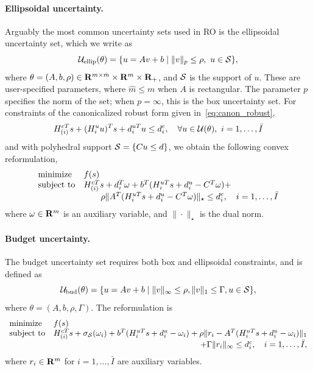 \paragraph{Ellipsoidal uncertainty.}
Arguably the most common uncertainty sets used in \gls{RO} is the ellipsoidal uncertainty set, which we write as
$$ {\mathcal{U}}_{\text{ellip}}(\theta) = \{u=Av+b \mid \| v \|_p \leq \rho,~u \in \mathcal{S} \},$$
where $\theta = (A,b,\rho) \in {\mathbf R}^{m\times\hat{m}} \times {\mathbf R}^m \times {\mathbf R}_+$, and $\mathcal{S}$ is the support of $u$. These are user-specified parameters, where $\hat{m} \leq m$ when $A$ is rectangular. The parameter $p$ specifies the norm of the set; when $p = \infty$, this is the box uncertainty set.
For constraints of the canonicalized robust form given in~\eqref{eq:canon_robust}, \ie 
\begin{equation}
\label{eq:simpleaffine}
H^{cT}_{(i)}s + (H^u_iu)^Ts + d_i^{uT}u \le d_i^c, \quad \forall u \in {\mathcal{U}}(\theta),~ i = 1,\dots,\bar{I}
\end{equation}
 and with polyhedral support $\mathcal{S} = \{Cu\leq d\}$, we obtain the following convex reformulation,
\begin{equation*}
	\begin{array}{ll}
		\mbox{minimize} & f(s)\\
		\mbox{subject to} & H^{cT}_{(i)}s +  d_i^T\omega + b^T( H_i^{uT}s + d_i^u -C^T\omega) +  \\
        &\qquad \rho\|A^T(H_i^{uT}s + d_i^u-C^T\omega)\|_\star \le d_i^c, \quad i = 1,\dots,\bar{I}	\end{array}
\end{equation*}
where $\omega \in {\mathbf R}^m$ is an auxiliary variable, and $\|\cdot\|_\star$ is the dual norm. 

\paragraph{Budget uncertainty.}
The budget uncertainty set requires both box and ellipsoidal constraints, and is defined as
$$ {\mathcal{U}}_{\text{bud}}(\theta) = \{u = Av+b \mid \| v\|_\infty \leq \rho, \| v \|_1 \leq \Gamma, u \in \mathcal{S}\},$$
where $\theta = (A,b, \rho, \Gamma)$.
The reformulation is 
\begin{equation}
	\label{eq:budget_max}
	\begin{array}{ll}
		\mbox{minimize} & f(s)\\
		\mbox{subject to} &  H^{cT}_{(i)}s +  \sigma_\supp(\om_i) + b^T(H_i^{uT}s + d_i^u - \om_i) + \rho\|r_i - A^T(H_i^{uT}s + d_i^u - \om_i)\|_1 \\
  & \hfill + \Gamma\|r_i\|_\infty \leq d_i^c, \quad i = 1,\dots,\bar{I},
	\end{array}
\end{equation}
where $r_i \in {\mathbf R}^m$ for $i = 1,\dots,\bar{I}$ are auxiliary variables.
